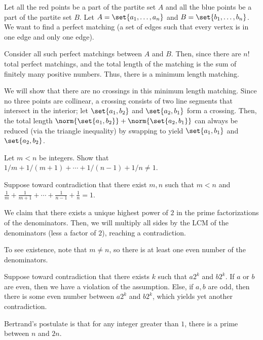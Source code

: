\documentclass[10pt]{mypackage}
\begin{document}
\begin{solution}
  Let all the red points be a part of the partite set $A$ and all the blue points be a part of the partite set $B$. Let $A = \set{a_1,\dots,a_n}$ and $B = \set{b_1,\dots,b_n}$. We want to find a perfect matching (a set of edges such that every vertex is in one edge and only one edge).\newline

  Consider all such perfect matchings between $A$ and $B$. Then, since there are $n!$ total perfect matchings, and the total length of the matching is the sum of finitely many positive numbers. Thus, there is a minimum length matching.\newline

  We will show that there are no crossings in this minimum length matching. Since no three points are collinear, a crossing consists of two line segments that intersect in the interior; let $\set{a_1,b_2}$ and $\set{a_2,b_1}$ form a crossing. Then, the total length $\norm{\set{a_1,b_2}} + \norm{\set{a_2,b_1}}$ can always be reduced (via the triangle inequality) by swapping to yield $\set{a_1,b_1}$ and $\set{a_2,b_2}$.
\end{solution}
\begin{problem}
  Let $m < n$ be integers. Show that $1/m + 1/(m+1) + \cdots + 1/(n-1) + 1/n \neq 1$.
\end{problem}
\begin{solution}
  Suppose toward contradiction that there exist $m,n$ such that $m < n$ and $\frac{1}{m} + \frac{1}{m+1} + \cdots + \frac{1}{n-1} + \frac{1}{n} = 1$.\newline

  We claim that there exists a unique highest power of $2$ in the prime factorizations of the denominators. Then, we will multiply all sides by the LCM of the denominators (less a factor of $2$), reaching a contradiction.\newline

  To see existence, note that $m\neq n$, so there is at least one even number of the denominators.\newline

  Suppose toward contradiction that there exists $k$ such that $a2^{k}$ and $b2^{k}$. If $a$ or $b$ are even, then we have a violation of the assumption. Else, if $a,b$ are odd, then there is some even number between $a2^{k}$ and $b2^{k}$, which yields yet another contradiction.
\end{solution}
\begin{remark}
  Bertrand's postulate is that for any integer greater than $1$, there is a prime between $n$ and $2n$.
\end{remark}
\end{document}
